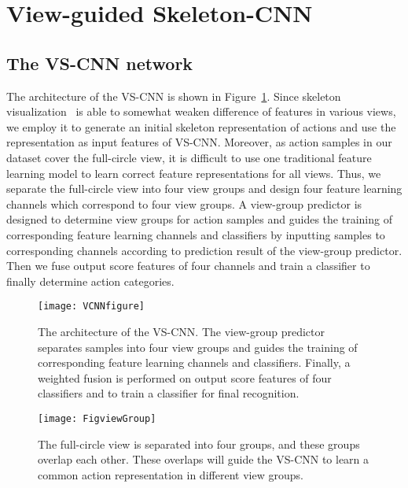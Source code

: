 \documentclass[journal]{IEEEtran}
\begin{document}
\section{View-guided Skeleton-CNN}
\label{sec:VSK-CNN}

\subsection{The VS-CNN network}
The architecture of the VS-CNN is shown in Figure~\ref{fig:VSCNN}. Since skeleton visualization~\cite{EnhancedSK2017} is able to somewhat weaken difference of features in various views, we employ it to generate an initial skeleton representation of actions and use the representation as input features of VS-CNN. Moreover, as action samples in our dataset cover the  full-circle view, it is difficult to use one traditional feature learning model to learn correct feature representations for all views. Thus, we separate the full-circle view into four view groups and design four feature learning channels which correspond to four view groups. A view-group predictor is designed to determine view groups for action samples and guides the training of corresponding feature learning channels and classifiers by inputting samples to corresponding channels according to prediction result of the view-group predictor. Then we fuse output score features of four channels and train a classifier to finally determine action categories.

\begin{figure}[t]
\begin{center}
\texttt{[image: VCNNfigure]}
\end{center}
   \caption{The architecture of the VS-CNN. The view-group predictor separates samples into four view groups and guides the training of corresponding feature learning channels and classifiers. Finally, a weighted fusion is performed on output score features of four classifiers and to train a classifier for final recognition. }
\label{fig:VSCNN}
\end{figure}

\begin{figure}[t]
\begin{center}
\texttt{[image: FigviewGroup]}
\end{center}
   \caption{The  full-circle view is separated into four groups, and these groups overlap each other. These overlaps will guide the VS-CNN to learn a common action representation in different view groups.}
\label{fig:viewGroup}
\end{figure}
\end{document}
